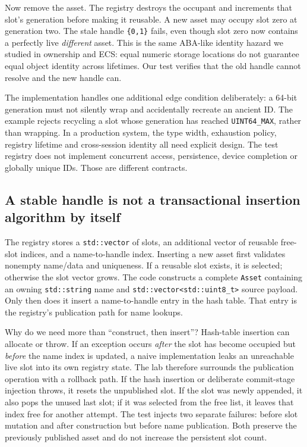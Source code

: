 Now remove the asset. The registry destroys the occupant and increments that slot's generation before making it reusable. A new asset may occupy slot zero at generation two. The stale handle \texttt{\{0,1\}} fails, even though slot zero now contains a perfectly live \emph{different} asset. This is the same ABA-like identity hazard we studied in ownership and ECS: equal numeric storage locations do not guarantee equal object identity across lifetimes. Our test verifies that the old handle cannot resolve and the new handle can.

The implementation handles one additional edge condition deliberately: a 64-bit generation must not silently wrap and accidentally recreate an ancient ID. The example rejects recycling a slot whose generation has reached \texttt{UINT64\_MAX}, rather than wrapping. In a production system, the type width, exhaustion policy, registry lifetime and cross-session identity all need explicit design. The test registry does not implement concurrent access, persistence, device completion or globally unique IDs. Those are different contracts.

\subsection{A stable handle is not a transactional insertion algorithm by itself}\label{05-engine-i-ch005-a-stable-handle-is-not-a-transactional-insertion-algorithm-by-itself}

The registry stores a \texttt{std::vector} of slots, an additional vector of reusable free-slot indices, and a name-to-handle index. Inserting a new asset first validates nonempty name/data and uniqueness. If a reusable slot exists, it is selected; otherwise the slot vector grows. The code constructs a complete \texttt{Asset} containing an owning \texttt{std::string} name and \texttt{std::vector\textless{}std::uint8\_t\textgreater{}} source payload. Only then does it insert a name-to-handle entry in the hash table. That entry is the registry's publication path for name lookups.

Why do we need more than ``construct, then insert''? Hash-table insertion can allocate or throw. If an exception occurs \emph{after} the slot has become occupied but \emph{before} the name index is updated, a naive implementation leaks an unreachable live slot into its own registry state. The lab therefore surrounds the publication operation with a rollback path. If the hash insertion or deliberate commit-stage injection throws, it resets the unpublished slot. If the slot was newly appended, it also pops the unused last slot; if it was selected from the free list, it leaves that index free for another attempt. The test injects two separate failures: before slot mutation and after construction but before name publication. Both preserve the previously published asset and do not increase the persistent slot count.

